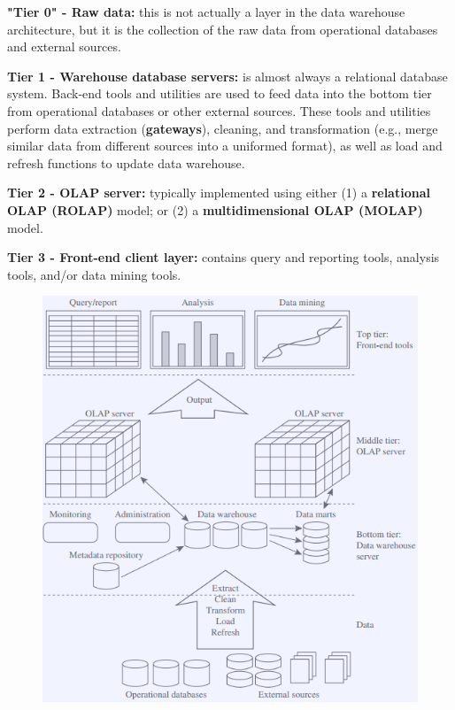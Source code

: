 		{\bf "Tier 0" - Raw data:} this is not actually a layer in the data warehouse architecture, 
		but it is the collection of the raw data from operational databases and external sources.

		{\bf Tier 1 - Warehouse database servers:} is almost always a relational database system.
		Back-end tools and utilities are used to feed data into the bottom tier from operational
		databases or other external sources. These tools and utilities perform data extraction
		({\bf gateways}), 
		cleaning, and transformation (e.g., merge similar data from different sources into a 
		uniformed format), as well as load and refresh functions to update data warehouse. 

		{\bf Tier 2 - OLAP server:} typically implemented using either (1) a {\bf relational OLAP (ROLAP)}
		model; or (2) a {\bf multidimensional OLAP (MOLAP)} model. 

		{\bf Tier 3 - Front-end client layer:} contains query and reporting tools, analysis
		tools, and/or data mining tools.

		\begin{figure}[H]
			\centering
			\includegraphics[width=\textwidth]{pics/mutitier.png}
		\end{figure}

